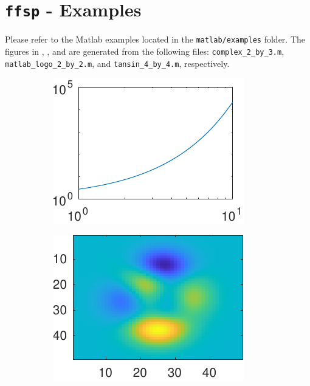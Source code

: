 
\section{\texttt{ffsp} \label{sec:ffsp} - Examples}
	
	Please refer to the Matlab examples located in the \texttt{matlab/examples} folder. 
	The figures in , , and  are generated from the following files: \texttt{complex\_2\_by\_3.m}, \texttt{matlab\_logo\_2\_by\_2.m}, and \texttt{tansin\_4\_by\_4.m}, respectively.
	
	\begin{figure}[H]
		\centering
		\begin{subfigure}[b]{\threefig\textwidth}
			\centering
			\includegraphics{../matlab/fig/examples/loglog-with-ffsp.pdf}
		\end{subfigure}
		\hfil
		\begin{subfigure}[b]{\threefig\textwidth}
			\centering
			\includegraphics{../matlab/fig/examples/peaks-with-ffsp.pdf}
		\end{subfigure}

\end{figure}
